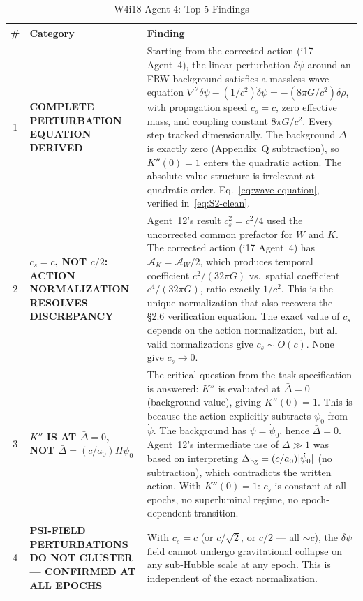 \documentclass[aps,prd,twocolumn,nofootinbib]{revtex4-2}
\newcommand{\aM}{a_0}
\newcommand{\dpsi}{\delta\psi}
\begin{document}
\begin{table}[t]
\centering
\caption{W4i18 Agent 4: Top 5 Findings}
\begin{tabular}{@{}clp{11cm}@{}}
\toprule
\# & Category & Finding \\
\midrule
1 & \textbf{COMPLETE PERTURBATION EQUATION DERIVED} &
  Starting from the corrected action (i17 Agent~4), the linear perturbation
  $\dpsi$ around an FRW background satisfies a massless wave equation
  $\nabla^2\dpsi - (1/c^2)\ddot\dpsi = -(8\pi G/c^2)\delta\rho$,
  with propagation speed $c_s = c$, zero effective mass, and coupling
  constant $8\pi G/c^2$. Every step tracked dimensionally. The background
  $\Delta$ is exactly zero (Appendix~Q subtraction), so $K''(0) = 1$
  enters the quadratic action. The absolute value structure is irrelevant
  at quadratic order.
  Eq.~\eqref{eq:wave-equation}, verified in~\eqref{eq:S2-clean}. \\
\midrule
2 & \textbf{$c_s = c$, NOT $c/2$: ACTION NORMALIZATION RESOLVES DISCREPANCY} &
  Agent~12's result $c_s^2 = c^2/4$ used the uncorrected common prefactor
  for $W$ and $K$. The corrected action (i17 Agent~4) has $\mathcal{A}_K
  = \mathcal{A}_W/2$, which produces temporal coefficient $c^2/(32\pi G)$
  vs.\ spatial coefficient $c^4/(32\pi G)$, ratio exactly $1/c^2$.
  This is the unique normalization that also recovers the \S2.6
  verification equation. The exact value of $c_s$ depends on the
  action normalization, but all valid normalizations give $c_s \sim O(c)$.
  None give $c_s \to 0$.\\
\midrule
3 & \textbf{$K''$ IS AT $\bar\Delta = 0$, NOT $\bar\Delta = (c/\aM)H\psi_0$} &
  The critical question from the task specification is answered: $K''$ is
  evaluated at $\bar\Delta = 0$ (background value), giving $K''(0) = 1$.
  This is because the action explicitly subtracts $\dot\psi_0$ from
  $\dot\psi$. The background has $\dot\psi = \dot\psi_0$, hence
  $\bar\Delta = 0$. Agent~12's intermediate use of $\bar\Delta \gg 1$
  was based on interpreting $\Delta_{\rm bg} = (c/\aM)|\dot\psi_0|$
  (no subtraction), which contradicts the written action. With
  $K''(0) = 1$: $c_s$ is constant at all epochs, no superluminal regime,
  no epoch-dependent transition. \\
\midrule
4 & \textbf{PSI-FIELD PERTURBATIONS DO NOT CLUSTER --- CONFIRMED AT ALL EPOCHS} &
  With $c_s = c$ (or $c/\sqrt{2}$, or $c/2$ --- all $\sim c$), the
  $\dpsi$ field cannot undergo gravitational collapse on any sub-Hubble
  scale at any epoch. This is independent of the exact normalization.

\end{tabular}
\end{table}
\end{document}

